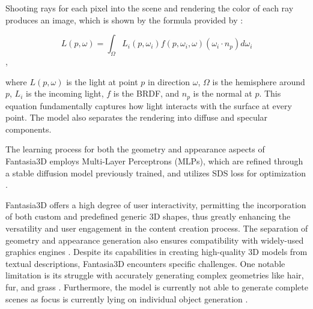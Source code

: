 Shooting rays for each pixel into the scene and rendering the color of each ray produces an image, which is shown by the formula provided by \citeauthor{chen2023fantasia3d}:

\[ L(p, \omega) = \int_{\Omega} L_i(p, \omega_i) f(p, \omega_i, \omega) (\omega_i \cdot n_p) d\omega_i \] \citep{chen2023fantasia3d},

where \( L(p, \omega) \) is the light at point \( p \) in direction \( \omega \), \( \Omega \) is the hemisphere around \( p \), \( L_i \) is the incoming light, \( f \) is the BRDF, and \( n_p \) is the normal at \( p \). This equation fundamentally captures how light interacts with the surface at every point. The model also separates the rendering into diffuse and specular components. 

The learning process for both the geometry and appearance aspects of Fantasia3D employs Multi-Layer Perceptrons (MLPs), which are refined through a stable diffusion model previously trained, and utilizes SDS loss for optimization \citep{rombachStableDiffusion}. 

Fantasia3D offers a high degree of user interactivity, permitting the incorporation of both custom and predefined generic 3D shapes, thus greatly enhancing the versatility and user engagement in the content creation process. The separation of geometry and appearance generation also ensures compatibility with widely-used graphics engines \citep{chen2023fantasia3d}. Despite its capabilities in creating high-quality 3D models from textual descriptions, Fantasia3D encounters specific challenges. One notable limitation is its struggle with accurately generating complex geometries like hair, fur, and grass \citep{chen2023fantasia3d}. Furthermore, the model is currently not able to generate complete scenes as focus is currently lying on individual object generation \citep{chen2023fantasia3d}.